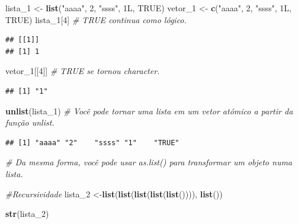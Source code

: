 \documentclass[
]{article}
\newenvironment{Shaded}{\begin{snugshade}}{\end{snugshade}}
\newcommand{\CommentTok}[1]{\textcolor[rgb]{0.56,0.35,0.01}{\textit{#1}}}
\newcommand{\DecValTok}[1]{\textcolor[rgb]{0.00,0.00,0.81}{#1}}
\newcommand{\KeywordTok}[1]{\textcolor[rgb]{0.13,0.29,0.53}{\textbf{#1}}}
\newcommand{\NormalTok}[1]{#1}
\newcommand{\OtherTok}[1]{\textcolor[rgb]{0.56,0.35,0.01}{#1}}
\newcommand{\StringTok}[1]{\textcolor[rgb]{0.31,0.60,0.02}{#1}}
\begin{document}
\begin{Shaded}
\begin{Highlighting}[]
\NormalTok{lista_}\DecValTok{1}\NormalTok{ <-}\StringTok{ }\KeywordTok{list}\NormalTok{(}\StringTok{"aaaa"}\NormalTok{, }\DecValTok{2}\NormalTok{, }\StringTok{"ssss"}\NormalTok{, 1L, }\OtherTok{TRUE}\NormalTok{)}
\NormalTok{vetor_}\DecValTok{1}\NormalTok{ <-}\StringTok{ }\KeywordTok{c}\NormalTok{(}\StringTok{"aaaa"}\NormalTok{, }\DecValTok{2}\NormalTok{, }\StringTok{"ssss"}\NormalTok{, 1L, }\OtherTok{TRUE}\NormalTok{)}
\NormalTok{lista_}\DecValTok{1}\NormalTok{[}\DecValTok{4}\NormalTok{] }\CommentTok{# TRUE continua como lógico.}
\end{Highlighting}
\end{Shaded}

\begin{verbatim}
## [[1]]
## [1] 1
\end{verbatim}

\begin{Shaded}
\begin{Highlighting}[]
\NormalTok{vetor_}\DecValTok{1}\NormalTok{[[}\DecValTok{4}\NormalTok{]] }\CommentTok{# TRUE se tornou character.}
\end{Highlighting}
\end{Shaded}

\begin{verbatim}
## [1] "1"
\end{verbatim}

\begin{Shaded}
\begin{Highlighting}[]
\KeywordTok{unlist}\NormalTok{(lista_}\DecValTok{1}\NormalTok{) }\CommentTok{# Você pode tornar uma lista em um vetor atómico a partir da função unlist.}
\end{Highlighting}
\end{Shaded}

\begin{verbatim}
## [1] "aaaa" "2"    "ssss" "1"    "TRUE"
\end{verbatim}

\begin{Shaded}
\begin{Highlighting}[]
\CommentTok{# Da mesma forma, você pode usar as.list() para transformar um objeto numa lista.}

\CommentTok{#Recursividade}
\NormalTok{lista_}\DecValTok{2}\NormalTok{ <-}\KeywordTok{list}\NormalTok{(}\KeywordTok{list}\NormalTok{(}\KeywordTok{list}\NormalTok{(}\KeywordTok{list}\NormalTok{(}\KeywordTok{list}\NormalTok{()))), }\KeywordTok{list}\NormalTok{())}

\KeywordTok{str}\NormalTok{(lista_}\DecValTok{2}\NormalTok{)}
\end{Highlighting}
\end{Shaded}
\end{document}
